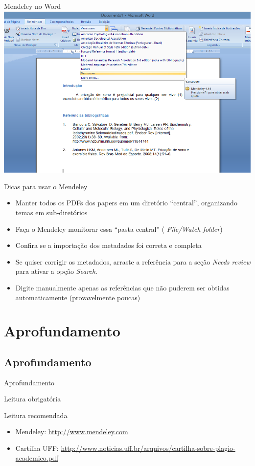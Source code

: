 \documentclass{beamer}
\begin{document}
\begin{frame}{Mendeley no Word}
  \includegraphics[width=1.1\textwidth]{Referencias/mendeley-word-vancouver}
\end{frame}

\begin{frame}{Dicas para usar o Mendeley}
  \begin{itemize}
  \item Manter \alert{todos} os PDFs dos papers em um diretório
    ``central'', organizando temas em sub-diretórios
  \item Faça o Mendeley \alert{monitorar} essa ``pasta central'' ({\em
      File/Watch folder})
  \item Confira se a importação dos metadados foi correta e completa
  \item Se quiser corrigir os metadados, arraste a referência para a
    seção {\em Needs review} para ativar a opção {\em Search}.
  \item Digite manualmente apenas as referências que não puderem ser
    obtidas automaticamente (provavelmente poucas)
  \end{itemize}
\end{frame}

\section{Aprofundamento}

\subsection{Aprofundamento}

\begin{frame}{Aprofundamento}
  \begin{block}{Leitura obrigatória}
  \end{block}
  \begin{block}{Leitura recomendada}
    \begin{itemize}
      \scriptsize
    \item Mendeley: \url{http://www.mendeley.com}
    \item Cartilha UFF: \url{http://www.noticias.uff.br/arquivos/cartilha-sobre-plagio-academico.pdf}
    \end{itemize}
  \end{block}
\end{frame}
\end{document}
